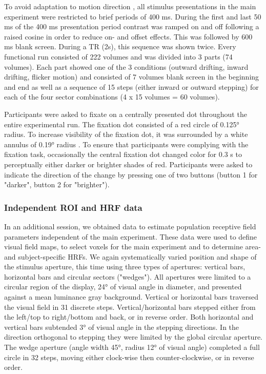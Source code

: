 To avoid adaptation to motion direction \parencite{Fu2004, Schellart2004}, all stimulus presentations in the main experiment were restricted to brief periods of 400 ms. During the first and last 50 ms of the 400 ms presentation period contrast was ramped on and off following a raised cosine in order to reduce on- and offset effects. This was followed by 600 ms blank screen. During a TR (2s), this sequence was shown twice. Every functional run consisted of 222 volumes and was divided into 3 parts (74 volumes). Each part showed one of the 3 conditions (outward drifting, inward drifting, flicker motion) and consisted of 7 volumes blank screen in the beginning and end as well as a sequence of 15 steps (either inward or outward stepping) for each of the four sector combinations (4 x 15 volumes = 60 volumes).

Participants were asked to fixate on a centrally presented dot throughout the entire experimental run. The fixation dot consisted of a red circle of 0.125° radius. To increase visibility of the fixation dot, it was surrounded by a white annulus of 0.19° radius \parencite{Harvey2016}. To ensure that participants were complying with the fixation task, occasionally the central fixation dot changed color for 0.3 s to perceptually either darker or brighter shades of red. Participants were asked to indicate the direction of the change by pressing one of two buttons (button 1 for "darker", button 2 for "brighter").

\subsubsection{Independent ROI and HRF data}
In an additional session, we obtained data to estimate population receptive field parameters independent of the main experiment. These data were used to define visual field maps, to select voxels for the main experiment and to determine area- and subject-specific HRFs. We again systematically varied position and shape of the stimulus aperture, this time using three types of apertures: vertical bars, horizontal bars and circular sectors ("wedges"). All apertures were limited to a circular region of the display, 24° of visual angle in diameter, and presented against a mean luminance gray background. Vertical or horizontal bars traversed the visual field in 31 discrete steps. Vertical/horizontal bars stepped either from the left/top to right/bottom and back, or in reverse order. Both horizontal and vertical bars subtended 3° of visual angle in the stepping directions. In the direction orthogonal to stepping they were limited by the global circular aperture. The wedge aperture (angle width 45°, radius 12° of visual angle) completed a full circle in 32 steps, moving either clock-wise then counter-clockwise, or in reverse order.


